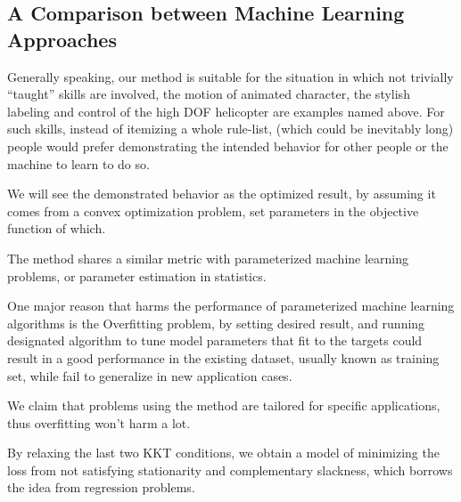 \subsection{A Comparison between Machine Learning Approaches}
Generally speaking, our method is suitable for the situation in which not trivially ``taught'' skills are involved, the motion of animated character, the stylish labeling and control of the high DOF helicopter are examples named above.
For such skills, instead of itemizing a whole rule-list, (which could be inevitably long) people would prefer demonstrating the intended behavior for other people or the machine to learn to do so.

We will see the demonstrated behavior as the optimized result, by assuming it comes from a convex optimization problem, set parameters in the objective function of which.

The method shares a similar metric with parameterized machine learning problems, or parameter estimation in statistics.

One major reason that harms the performance of parameterized machine learning algorithms is the Overfitting problem, by setting desired result, and running designated algorithm to tune model parameters that fit to the targets could result in a good performance in the existing dataset, usually known as training set, while fail to generalize in new application cases.

We claim that problems using the method are tailored for specific applications, thus overfitting won't harm a lot.

By relaxing the last two KKT conditions, we obtain a model of minimizing the loss from not satisfying stationarity and complementary slackness, which borrows the idea from regression problems.
